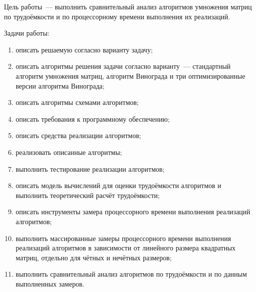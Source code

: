 

Цель работы~--- выполнить сравнительный анализ алгоритмов умножения матриц по трудоёмкости и по процессорному времени выполнения их реализаций.

Задачи работы:
\begin{enumerate}
	\item описать решаемую согласно варианту задачу;
	\item описать алгоритмы решения задачи согласно варианту~--- стандартный алгоритм умножения матриц, алгоритм Винограда и три оптимизированные версии алгоритма Винограда;
	\item описать алгоритмы схемами алгоритмов;
	\item описать требования к программному обеспечению;
	\item описать средства реализации алгоритмов;
	\item реализовать описанные алгоритмы;
	\item выполнить тестирование реализации алгоритмов;
	\item описать модель вычислений для оценки трудоёмкости алгоритмов и выполнить теоретический расчёт трудоёмкости;
	\item описать инструменты замера процессорного времени выполнения реализаций алгоритмов;
	\item выполнить массированные замеры процессорного времени выполнения реализаций алгоритмов в зависимости от линейного размера квадратных матриц, отдельно для чётных и нечётных размеров;
	\item выполнить сравнительный анализ алгоритмов по трудоёмкости и по данным выполненных замеров.
\end{enumerate}
